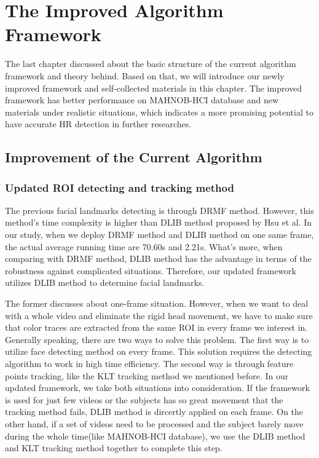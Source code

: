 \chapter{The Improved Algorithm Framework}
The last chapter discussed about the basic structure of the current algorithm framework and theory behind. Based on that, we will introduce our newly improved framework and self-collected materials in this chapter. The improved framework has better performance on MAHNOB-HCI database and new materials under realistic situations, which indicates a more promising potential to have accurate HR detection in further researches.

\section{Improvement of the Current Algorithm}
\subsection{Updated ROI detecting and tracking method}
The previous facial landmarks detecting is through DRMF method. However, this method's time complexity is higher than DLIB method proposed by Hsu et al.\cite{hsu2002face,king2009dlib} In our study, when we deploy DRMF method and DLIB method on one same frame, the actual average running time are 70.60s and 2.21s.
What's more, when comparing with DRMF method, DLIB method has the advantage in terms of the robustness against complicated situations. Therefore, our updated framework utilizes DLIB method to determine facial landmarks.

The former discusses about one-frame situation. However, when we want to deal with a whole video and eliminate the rigid head movement, we have to make sure that color traces are extracted from the same ROI in every frame we interest in. Generally speaking, there are two ways to solve this problem. The first way is to utilize face detecting method on every frame. This solution requires the detecting algorithm to work in high time efficiency. The second way is through feature points tracking, like the KLT tracking method we mentioned before. In our updated framework, we take both situations into consideration. If the framework is used for just few videos or the subjects has so great movement that the tracking method fails, DLIB method is dircertly applied on each frame. On the other hand, if a set of videos need to be processed and the subject barely move during the whole time(like MAHNOB-HCI database), we use the DLIB method and KLT tracking method together to complete this step. 

